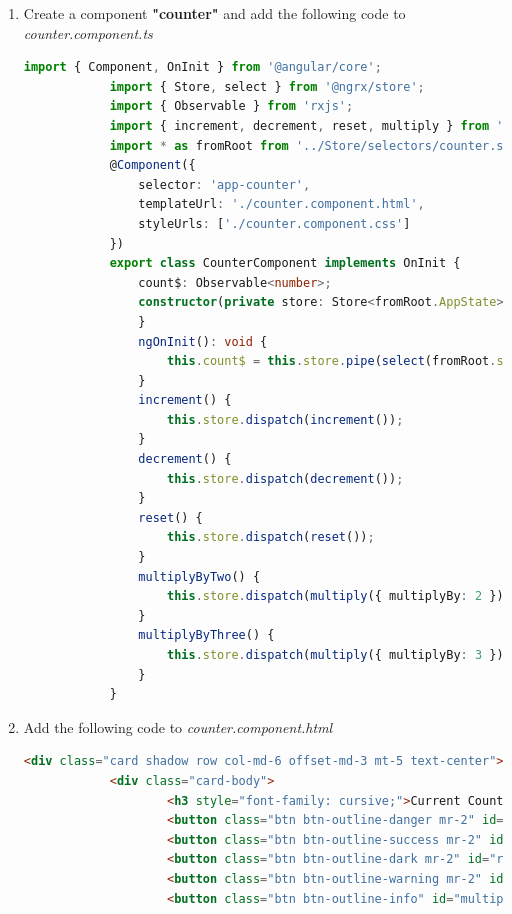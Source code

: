 \documentclass{report}
\begin{document}
\begin{enumerate}
\begin{lstlisting}[language=Typescript, caption=app/Store/selectors/counter.selector.ts]
					counter: number;
			}
			export interface AppState {
					count: FeatureState;
			}
			export const selectFeature = (state: AppState) => { return state.count };
			export const selectFeatureCount = createSelector(
					selectFeature,
					(state: FeatureState) => state.counter
			);
\end{lstlisting}
\item{Create a component \textbf{"counter"} and add the following code to \textit{counter.component.ts}}
		\begin{lstlisting}[language=Typescript, caption=counter.component.ts]
			import { Component, OnInit } from '@angular/core';
			import { Store, select } from '@ngrx/store';
			import { Observable } from 'rxjs';
			import { increment, decrement, reset, multiply } from '../Store/actions/counter.action';
			import * as fromRoot from '../Store/selectors/counter.selector';
			@Component({
				selector: 'app-counter',
				templateUrl: './counter.component.html',
				styleUrls: ['./counter.component.css']
			})
			export class CounterComponent implements OnInit {
				count$: Observable<number>;
				constructor(private store: Store<fromRoot.AppState>) {
				}
				ngOnInit(): void {
					this.count$ = this.store.pipe(select(fromRoot.selectFeatureCount))
				}
				increment() {
					this.store.dispatch(increment());
				}
				decrement() {
					this.store.dispatch(decrement());
				}
				reset() {
					this.store.dispatch(reset());
				}
				multiplyByTwo() {
					this.store.dispatch(multiply({ multiplyBy: 2 }))
				}
				multiplyByThree() {
					this.store.dispatch(multiply({ multiplyBy: 3 }))
				}
			}
\end{lstlisting}
\item{Add the following code to \textit{counter.component.html}}
	\begin{lstlisting}[language=HTML, caption=counter.component.html]
		<div class="card shadow row col-md-6 offset-md-3 mt-5 text-center">
			<div class="card-body">
					<h3 style="font-family: cursive;">Current Count: {{ count$  | async }}</h3>
					<button class="btn btn-outline-danger mr-2" id="increment" (click)="increment()">Increment</button>
					<button class="btn btn-outline-success mr-2" id="decrement" (click)="decrement()">Decrement</button>
					<button class="btn btn-outline-dark mr-2" id="reset" (click)="reset()">Reset Counter</button>
					<button class="btn btn-outline-warning mr-2" id="multiply" (click)="multiplyByTwo()">Multiply By 2</button>
					<button class="btn btn-outline-info" id="multiply" (click)="multiplyByThree()">Multiply By 3</button>

\end{lstlisting}
\end{enumerate}
\end{document}
